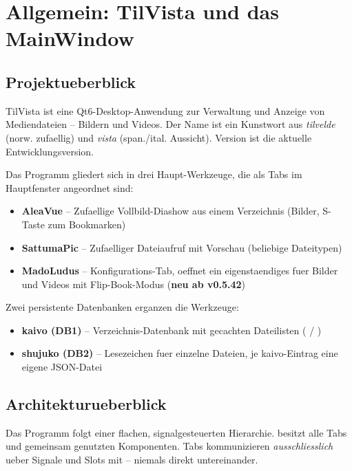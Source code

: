 \chapter{Allgemein: TilVista und das MainWindow}

\section{Projektueberblick}

TilVista ist eine Qt6-Desktop-Anwendung zur Verwaltung und
Anzeige von Mediendateien -- Bildern und Videos.
Der Name ist ein Kunstwort aus \emph{tilvelde}
(norw. zufaellig) und \emph{vista} (span./ital. Aussicht).
Version  ist die aktuelle Entwicklungsversion.

Das Programm gliedert sich in drei Haupt-Werkzeuge,
die als Tabs im Hauptfenster angeordnet sind:

\begin{itemize}[noitemsep]
  \item \textbf{AleaVue} -- Zufaellige Vollbild-Diashow aus
    einem Verzeichnis (Bilder, S-Taste zum Bookmarken)
  \item \textbf{SattumaPic} -- Zufaelliger Dateiaufruf mit
    Vorschau (beliebige Dateitypen)
  \item \textbf{MadoLudus} -- Konfigurations-Tab, oeffnet ein
    eigenstaendiges  fuer Bilder und
    Videos mit Flip-Book-Modus (\textbf{neu ab v0.5.42})
\end{itemize}

Zwei persistente Datenbanken erganzen die Werkzeuge:
\begin{itemize}[noitemsep]
  \item \textbf{kaivo (DB1)} -- Verzeichnis-Datenbank mit
    gecachten Dateilisten ( / )
  \item \textbf{shujuko (DB2)} -- Lesezeichen fuer einzelne
    Dateien, je kaivo-Eintrag eine eigene JSON-Datei
\end{itemize}

\section{Architekturueberblick}

Das Programm folgt einer flachen, signalgesteuerten Hierarchie.
 besitzt alle Tabs und gemeinsam genutzten
Komponenten. Tabs kommunizieren \emph{ausschliesslich} ueber
Signale und Slots mit  -- niemals direkt
untereinander.

